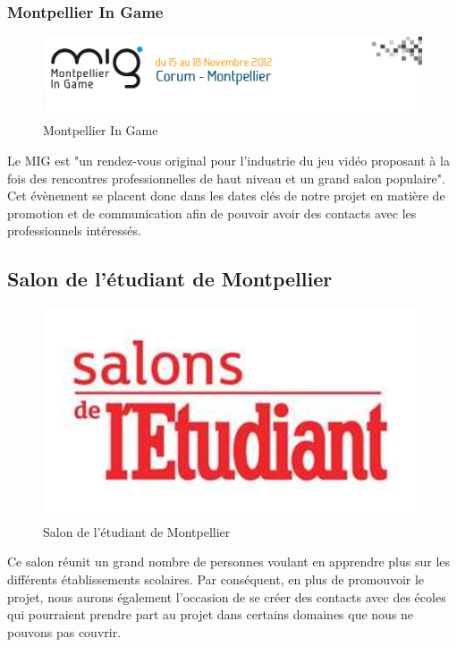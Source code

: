 \documentclass[11pt]{report} %
\begin{document}
			\subsubsection{Montpellier In Game}
				\begin{figure}[htb]
				\centering
				\includegraphics[width=1\textwidth]{mig.png}
				\caption{Montpellier In Game}
				\label{fig:Montpellier In Game}
				\end{figure}
	                                Le MIG est "un rendez-vous original pour l’industrie du jeu vidéo proposant à la fois des rencontres professionnelles de haut niveau et un grand salon populaire". Cet évènement se placent donc dans les dates clés de notre projet en matière de promotion et de communication afin de pouvoir avoir des contacts avec les professionnels intéressés.
			\subsection{Salon de l'étudiant de Montpellier}
				\begin{figure}[htb]
				\centering
				\includegraphics[width=1\textwidth]{salon-de-l-enseignement-superieur-de-montpellier.jpg}
				\caption{Salon de l'étudiant de Montpellier}
				\label{fig:Salon de l'étudiant de Montpellier}
				\end{figure}
				Ce salon réunit un grand nombre de personnes voulant en apprendre plus sur les différents établissements scolaires. Par conséquent, en plus de promouvoir le projet, nous aurons également l'occasion de se créer des contacts avec des écoles qui pourraient prendre part au projet dans certains domaines que nous ne pouvons pas couvrir.
\end{document}
